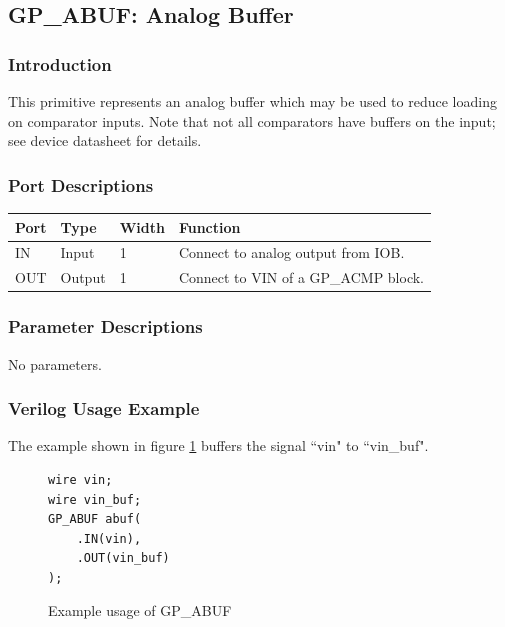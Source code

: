 \documentclass[11pt]{article}
\begin{document}

\pagebreak
\subsection{GP\_ABUF: Analog Buffer}

\subsubsection{Introduction}
This primitive represents an analog buffer which may be used to reduce loading on comparator inputs. Note that not all 
comparators have buffers on the input; see device datasheet for details.

\subsubsection{Port Descriptions}

\begin{tabularx}{5in}{|l|l|l|X|}
\hline
{\bfseries Port} & {\bfseries Type} & {\bfseries Width} & {\bfseries Function} \\
\hline
IN & Input & 1 & Connect to analog output from IOB.\\
\hline
OUT & Output & 1 & Connect to VIN of a GP\_ACMP block.\\
\hline
\end{tabularx}

\subsubsection{Parameter Descriptions}

No parameters.

\subsubsection{Verilog Usage Example}

The example shown in figure \ref{gp-abuf-example} buffers the signal ``vin" to ``vin\_buf".

\begin{figure}[h]
\begin{lstlisting}
wire vin;
wire vin_buf;
GP_ABUF abuf(
	.IN(vin),
	.OUT(vin_buf)
);
\end{lstlisting}
\caption{Example usage of GP\_ABUF}
\label{gp-abuf-example}
\end{figure}
\end{document}
